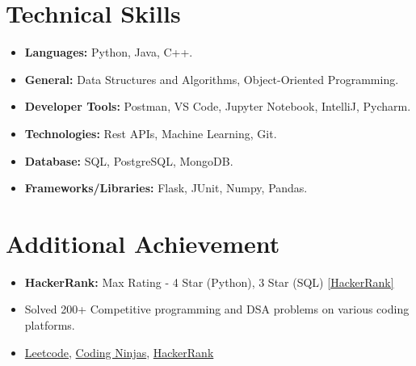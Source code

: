 \documentclass[a4paper,10pt]{article}
\begin{document}
\section*{Technical Skills}
\begin{itemize}[leftmargin=0.15in, itemsep=0.1em]
    \item \textbf{Languages:} Python, Java, C++.
    \item \textbf{General:} Data Structures and Algorithms, Object-Oriented Programming.
    \item \textbf{Developer Tools:} Postman, VS Code, Jupyter Notebook, IntelliJ, Pycharm.
    \item \textbf{Technologies:} Rest APIs, Machine Learning, Git.
    \item \textbf{Database:} SQL, PostgreSQL, MongoDB.
    \item \textbf{Frameworks/Libraries:} Flask, JUnit, Numpy, Pandas.
\end{itemize}

\section*{Additional Achievement}
\begin{itemize}[leftmargin=0.15in, itemsep=0.1em]
    \item \textbf{HackerRank:} Max Rating - 4 Star (Python), 3 Star (SQL) \href{https://www.hackerrank.com/profile/walimallikarjun2}{[HackerRank]}
    \item Solved 200+ Competitive programming and DSA problems on various coding platforms.
    \item \href{https://leetcode.com/Mallikarjun_W/}{Leetcode}, \href{https://www.codingninjas.com/studio/profile/Wali}{Coding Ninjas}, \href{https://www.hackerrank.com/profile/walimallikarjun2}{HackerRank}
\end{itemize}
\end{document}
